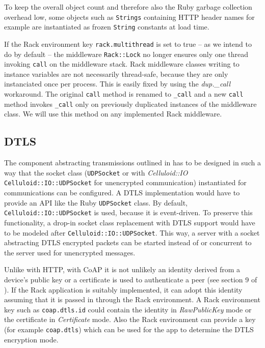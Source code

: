 
		To keep the overall object count and therefore also the Ruby garbage
		collection overhead low, some objects such as \texttt{Strings}
		containing \ac{HTTP} header names for example are instantiated as
		frozen \texttt{String} constants at load time.

		If the Rack environment key \texttt{rack.multithread} is set to true --
		as we intend to do by default -- the middleware \texttt{Rack::Lock} no
		longer ensures only one thread invoking \texttt{call} on the middleware
		stack. Rack middleware classes writing to instance variables are not
		necessarily thread-safe, because they are only instanciated once per
		process. This is easily fixed by using the \emph{dup.\_call}
		workaround. The original \texttt{call} method is renamed to
		\texttt{\_call} and a new \texttt{call} method invokes \texttt{\_call}
		only on previously duplicated instances of the middleware class. We
		will use this method on any implemented Rack middleware.

	\subsection{\acs{DTLS}}
	\label{cha:design:server:dtls}

		The component abstracting transmissions outlined in
		 has to be designed in such a way that
		the socket class (\texttt{UDPSocket} or with \emph{Celluloid::IO}
		\texttt{Celluloid::IO::UDPSocket} for unencrypted communication)
		instantiated for communications can be configured. A \ac{DTLS}
		implementation would have to provide an \ac{API} like the Ruby
		\texttt{UDPSocket} class. By default, \texttt{Celluloid::IO::UDPSocket}
		is used, because it is event-driven. To preserve this functionality, a
		drop-in socket class replacement with \ac{DTLS} support would have to
		be modeled after \texttt{Celluloid::IO::UDPSocket}. This way, a server
		with a socket abstracting \ac{DTLS} encrypted packets can be started
		instead of or concurrent to the server used for unencrypted messages.

		Unlike with \ac{HTTP}, with \ac{CoAP} it is not unlikely an identity
		derived from a device's public key or a certificate is used to
		authenticate a peer (see section 9 of \cite{coap}). If the Rack
		application is suitably implemented, it can adopt this identity
		assuming that it is passed in through the Rack environment. A Rack
		environment key such as \texttt{coap.dtls.id} could contain the
		identity in \emph{RawPublicKey} mode or the certificate in
		\emph{Certificate} mode. Also the Rack environment can provide a key
		(for example \texttt{coap.dtls}) which can be used for the app to
		determine the \ac{DTLS} encryption mode.


